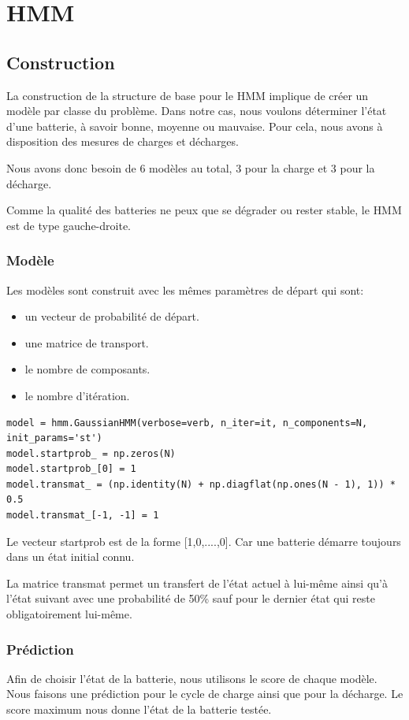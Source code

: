 \chapter{\ac{HMM}}
\section{Construction}
La construction de la structure de base pour le HMM implique de créer un modèle
par classe du problème. Dans notre cas, nous voulons déterminer l'état d'une batterie,
à savoir bonne, moyenne ou mauvaise. Pour cela, nous avons à disposition des mesures
de charges et décharges.

Nous avons donc besoin de 6 modèles au total, 3 pour la charge et 3 pour la décharge.

Comme la qualité des batteries ne peux que se dégrader ou rester stable, le \ac{HMM} est de type gauche-droite.

\subsection{Modèle}
Les modèles sont construit avec les mêmes paramètres de départ qui sont:
\begin{itemize}
    \item un vecteur de probabilité de départ.
    \item une matrice de transport.
    \item le nombre de composants.
    \item le nombre d'itération.
\end{itemize}

\begin{verbatim}
model = hmm.GaussianHMM(verbose=verb, n_iter=it, n_components=N, init_params='st')
model.startprob_ = np.zeros(N)
model.startprob_[0] = 1
model.transmat_ = (np.identity(N) + np.diagflat(np.ones(N - 1), 1)) * 0.5
model.transmat_[-1, -1] = 1
\end{verbatim}
Le vecteur startprob est de la forme [1,0,....,0]. Car une batterie démarre toujours
dans un état initial connu.

La matrice transmat permet un transfert de l'état actuel à lui-même ainsi qu'à
l'état suivant avec une probabilité de 50\% sauf pour le dernier état qui reste
obligatoirement lui-même.

\subsection{Prédiction}
Afin de choisir l'état de la batterie, nous utilisons le score de chaque modèle.
Nous faisons une prédiction pour le cycle de charge ainsi que pour la décharge.
Le score maximum nous donne l'état de la batterie testée.

